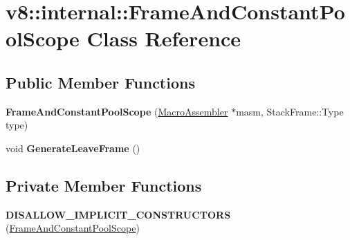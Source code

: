 \hypertarget{classv8_1_1internal_1_1_frame_and_constant_pool_scope}{}\section{v8\+:\+:internal\+:\+:Frame\+And\+Constant\+Pool\+Scope Class Reference}
\label{classv8_1_1internal_1_1_frame_and_constant_pool_scope}
\subsection*{Public Member Functions}
\begin{DoxyCompactItemize}
\item 
{\bfseries Frame\+And\+Constant\+Pool\+Scope} (\hyperlink{classv8_1_1internal_1_1_macro_assembler}{Macro\+Assembler} $\ast$masm, Stack\+Frame\+::\+Type type)\hypertarget{classv8_1_1internal_1_1_frame_and_constant_pool_scope_afef3825495745c8b98c5b3381ce99060}{}\label{classv8_1_1internal_1_1_frame_and_constant_pool_scope_afef3825495745c8b98c5b3381ce99060}

\item 
void {\bfseries Generate\+Leave\+Frame} ()\hypertarget{classv8_1_1internal_1_1_frame_and_constant_pool_scope_a98536f48fb32f9f419b288db0e0ca1cd}{}\label{classv8_1_1internal_1_1_frame_and_constant_pool_scope_a98536f48fb32f9f419b288db0e0ca1cd}

\end{DoxyCompactItemize}
\subsection*{Private Member Functions}
\begin{DoxyCompactItemize}
\item 
{\bfseries D\+I\+S\+A\+L\+L\+O\+W\+\_\+\+I\+M\+P\+L\+I\+C\+I\+T\+\_\+\+C\+O\+N\+S\+T\+R\+U\+C\+T\+O\+RS} (\hyperlink{classv8_1_1internal_1_1_frame_and_constant_pool_scope}{Frame\+And\+Constant\+Pool\+Scope})\hypertarget{classv8_1_1internal_1_1_frame_and_constant_pool_scope_abf156fff7e118dfca8420c45c33e3f6e}{}\label{classv8_1_1internal_1_1_frame_and_constant_pool_scope_abf156fff7e118dfca8420c45c33e3f6e}

\end{DoxyCompactItemize}
